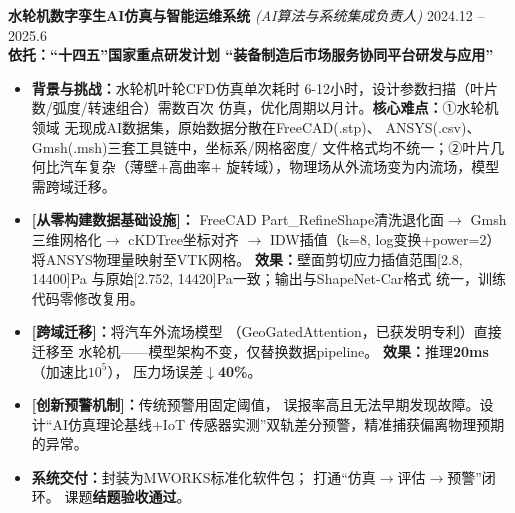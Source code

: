 \documentclass[11pt]{article}
\newlength{\interProjectSpacing}
\newcommand{\projectsep}{\vspace{\interProjectSpacing}}
\begin{document}
\textbf{水轮机数字孪生AI仿真与智能运维系统} 
\textit{(AI算法与系统集成负责人)} \hfill 2024.12 -- 2025.6\\[0.2em]
\textcolor{CVBlue}{\textbf{依托：``十四五''国家重点研发计划
``装备制造后市场服务协同平台研发与应用''}}
\begin{itemize}
    \item \textbf{背景与挑战：}水轮机叶轮CFD仿真单次耗时
    6-12小时，设计参数扫描（叶片数/弧度/转速组合）需数百次
    仿真，优化周期以月计。\textbf{核心难点：}①水轮机领域
    无现成AI数据集，原始数据分散在FreeCAD(.stp)、
    ANSYS(.csv)、Gmsh(.msh)三套工具链中，坐标系/网格密度/
    文件格式均不统一；②叶片几何比汽车复杂（薄壁+高曲率+
    旋转域），物理场从外流场变为内流场，模型需跨域迁移。

    \item \textbf{[从零构建数据基础设施]：}
    FreeCAD Part\_RefineShape清洗退化面$\rightarrow$ 
    Gmsh三维网格化$\rightarrow$ cKDTree坐标对齐
    $\rightarrow$ IDW插值（k=8, log变换+power=2）
    将ANSYS物理量映射至VTK网格。
    \textbf{效果：}壁面剪切应力插值范围[2.8, 14400]Pa
    与原始[2.752, 14420]Pa一致；输出与ShapeNet-Car格式
    统一，训练代码零修改复用。

    \item \textbf{[跨域迁移]：}将汽车外流场模型
    （GeoGatedAttention，已获发明专利）直接迁移至
    水轮机——模型架构不变，仅替换数据pipeline。
    \textbf{效果：}推理\textbf{20ms}（加速比$10^5$），
    压力场误差\textbf{$\downarrow$40\%}。

    \item \textbf{[创新预警机制]：}传统预警用固定阈值，
    误报率高且无法早期发现故障。设计``AI仿真理论基线+IoT
    传感器实测''双轨差分预警，精准捕获偏离物理预期的异常。

    \item \textbf{系统交付：}封装为MWORKS标准化软件包；
    打通``仿真$\rightarrow$评估$\rightarrow$预警''闭环。
    课题\textbf{结题验收通过}。
\end{itemize}

\projectsep
\end{document}
